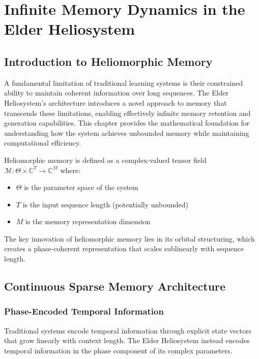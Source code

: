 \chapter{Infinite Memory Dynamics in the Elder Heliosystem}

\section{Introduction to Heliomorphic Memory}

A fundamental limitation of traditional learning systems is their constrained ability to maintain coherent information over long sequences. The Elder Heliosystem's architecture introduces a novel approach to memory that transcends these limitations, enabling effectively infinite memory retention and generation capabilities. This chapter provides the mathematical foundation for understanding how the system achieves unbounded memory while maintaining computational efficiency.

\begin{definition}
Heliomorphic memory is defined as a complex-valued tensor field $\mathcal{M}: \Theta \times \mathbb{C}^T \rightarrow \mathbb{C}^M$ where:
\begin{itemize}
    \item $\Theta$ is the parameter space of the system
    \item $T$ is the input sequence length (potentially unbounded)
    \item $M$ is the memory representation dimension
\end{itemize}
\end{definition}

The key innovation of heliomorphic memory lies in its orbital structuring, which creates a phase-coherent representation that scales sublinearly with sequence length.

\section{Continuous Sparse Memory Architecture}

\subsection{Phase-Encoded Temporal Information}

Traditional systems encode temporal information through explicit state vectors that grow linearly with context length. The Elder Heliosystem instead encodes temporal information in the phase component of its complex parameters.

